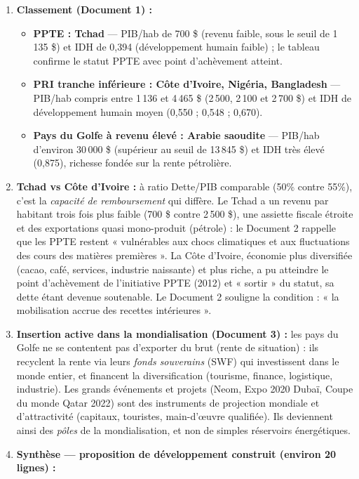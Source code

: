 \documentclass[11pt]{article}
\begin{document}
\begin{corrige}
\begin{enumerate}
\item \textbf{Classement (Document 1) :}
\begin{itemize}
\item \textbf{PPTE : Tchad} — PIB/hab de 700 \$ (revenu faible, sous le seuil de 1\,135 \$) et IDH de 0,394 (développement humain faible) ; le tableau confirme le statut PPTE avec point d'achèvement atteint.
\item \textbf{PRI tranche inférieure : Côte d'Ivoire, Nigéria, Bangladesh} — PIB/hab compris entre 1\,136 et 4\,465 \$ (2\,500, 2\,100 et 2\,700 \$) et IDH de développement humain moyen (0,550 ; 0,548 ; 0,670).
\item \textbf{Pays du Golfe à revenu élevé : Arabie saoudite} — PIB/hab d'environ 30\,000 \$ (supérieur au seuil de 13\,845 \$) et IDH très élevé (0,875), richesse fondée sur la rente pétrolière.
\end{itemize}
\item \textbf{Tchad vs Côte d'Ivoire :} à ratio Dette/PIB comparable (50\% contre 55\%), c'est la \emph{capacité de remboursement} qui diffère. Le Tchad a un revenu par habitant trois fois plus faible (700 \$ contre 2\,500 \$), une assiette fiscale étroite et des exportations quasi mono-produit (pétrole) : le Document 2 rappelle que les PPTE restent « vulnérables aux chocs climatiques et aux fluctuations des cours des matières premières ». La Côte d'Ivoire, économie plus diversifiée (cacao, café, services, industrie naissante) et plus riche, a pu atteindre le point d'achèvement de l'initiative PPTE (2012) et « sortir » du statut, sa dette étant devenue soutenable. Le Document 2 souligne la condition : « la mobilisation accrue des recettes intérieures ».
\item \textbf{Insertion active dans la mondialisation (Document 3) :} les pays du Golfe ne se contentent pas d'exporter du brut (rente de situation) : ils recyclent la rente via leurs \emph{fonds souverains} (SWF) qui investissent dans le monde entier, et financent la diversification (tourisme, finance, logistique, industrie). Les grands événements et projets (Neom, Expo 2020 Dubaï, Coupe du monde Qatar 2022) sont des instruments de projection mondiale et d'attractivité (capitaux, touristes, main-d'œuvre qualifiée). Ils deviennent ainsi des \emph{pôles} de la mondialisation, et non de simples réservoirs énergétiques.
\item \textbf{Synthèse — proposition de développement construit (environ 20 lignes) :}


\end{enumerate}
\end{corrige}
\end{document}
